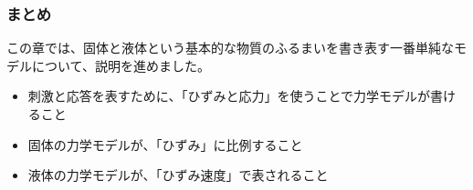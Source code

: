 \documentclass[12pt, dvipdfmx]{beamer}
\newcommand{\backupbegin}{
   \newcounter{framenumberappendix}
   \setcounter{framenumberappendix}{\value{framenumber}}
}
\begin{document}
\begin{frame}
	\frametitle{まとめ}
	この章では、固体と液体という基本的な物質のふるまいを書き表す一番単純なモデルについて、説明を進めました。
	\begin{boxnote}
			\begin{itemize}
				\item 刺激と応答を表すために、「ひずみと応力」を使うことで力学モデルが書けること
				\item 固体の力学モデルが、「ひずみ」に比例すること
				\item 液体の力学モデルが、「ひずみ速度」で表されること
			\end{itemize} 
	\end{boxnote}
\end{frame}


\end{document}
